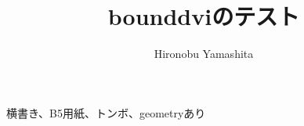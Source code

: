 \documentclass[b5paper,tombow]{jarticle}
\title{\textsf{bounddvi}のテスト}
\author{Hironobu Yamashita}
\begin{document}
横書き、B5用紙、トンボ、geometryあり
\end{document}
